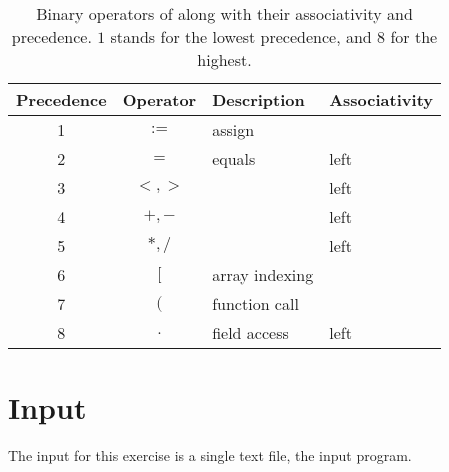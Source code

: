 \documentclass{article}
\begin{document}
\begin{table}[h]
\centering
\begin{tabular}{ |c|c|l|l| }
\hline
Precedence & Operator & Description & Associativity \\
\hline
\hline
1          & $:=$            & assign         &       \\
\hline
2          & $=$             & equals         & left  \\
\hline
3          & $<,>$           &                & left  \\
\hline
4          & $+,-$           &                & left  \\
\hline
5          & $*,/$           &                & left  \\
\hline
6          & $[$             & array indexing &       \\
\hline
7          & $($             & function call  &       \\
\hline
8          & $.$     & field access   & left          \\
\hline
\end{tabular}
\caption{
Binary operators of \plname along with their associativity and precedence.
$1$ stands for the lowest precedence, and $8$ for the highest.
\label{Table_Binary_Operators}}
\end{table}
\section{Input}
The input for this exercise is a single text file, the input \plname program.
\end{document}
